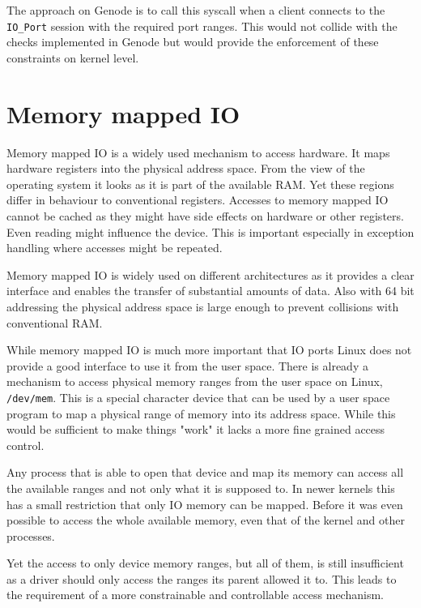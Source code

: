 \documentclass[
a4paper,
12pt,
notitlepage,
parskip=half,
DIV=11,
]{scrbook}
\begin{document}
		The approach on Genode is to call this syscall when a client connects to the \texttt{IO\_Port} session with the required port ranges.
		This would not collide with the checks implemented in Genode but would provide the enforcement of these constraints on kernel level.
		
		\section{Memory mapped IO}
		
		Memory mapped IO is a widely used mechanism to access hardware.
		It maps hardware registers into the physical address space.
		From the view of the operating system it looks as it is part of the available RAM.
		Yet these regions differ in behaviour to conventional registers.
		Accesses to memory mapped IO cannot be cached as they might have side effects on hardware or other registers.
		Even reading might influence the device.
		This is important especially in exception handling where accesses might be repeated.
		
		Memory mapped IO is widely used on different architectures as it provides a clear interface and enables the transfer of substantial amounts of data.
		Also with 64 bit addressing the physical address space is large enough to prevent collisions with conventional RAM.
		\citep{intelmanual}
		
		While memory mapped IO is much more important that IO ports Linux does not provide a good interface to use it from the user space.
		There is already a mechanism to access physical memory ranges from the user space on Linux, \texttt{/dev/mem}.
		This is a special character device that can be used by a user space program to map a physical range of memory into its address space.
		While this would be sufficient to make things "work" it lacks a more fine grained access control.
		
		Any process that is able to open that device and map its memory can access all the available ranges and not only what it is supposed to.
		In newer kernels this has a small restriction that only IO memory can be mapped.
		Before it was even possible to access the whole available memory, even that of the kernel and other processes. \citep{devmem}
		
		Yet the access to only device memory ranges, but all of them, is still insufficient as a driver should only access the ranges its parent allowed it to.
		This leads to the requirement of a more constrainable and controllable access mechanism.
		
\end{document}
